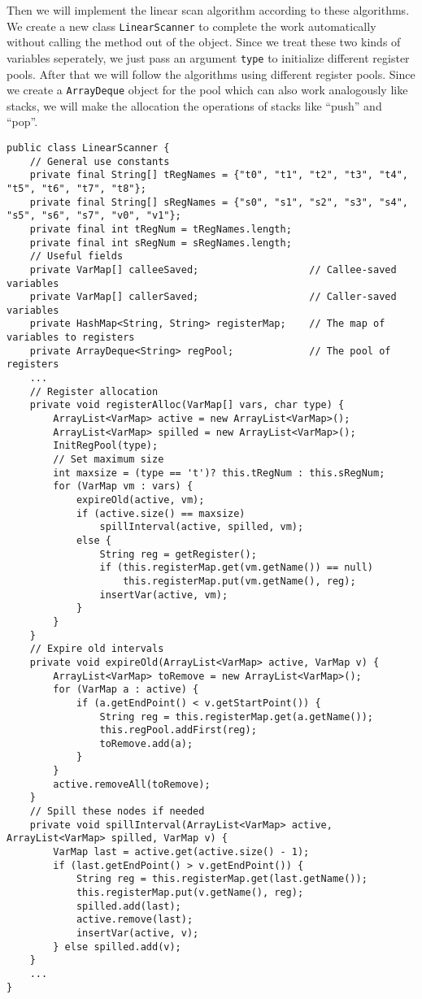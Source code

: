 \documentclass[letterpaper, 14pt]{article}
\begin{document}
Then we will implement the linear scan algorithm \cite{paper} according to these algorithms. We create a new class \texttt{LinearScanner} to complete the work automatically without calling the method out of the object. Since we treat these two kinds of variables seperately, we just pass an argument \texttt{type} to initialize different register pools. After that we will follow the algorithms using different register pools. Since we create a \texttt{ArrayDeque} object for the pool which can also work analogously like stacks, we will make the allocation the operations of stacks like ``push'' and ``pop''. 
\begin{lstlisting}
public class LinearScanner {
	// General use constants
	private final String[] tRegNames = {"t0", "t1", "t2", "t3", "t4", "t5", "t6", "t7", "t8"};
	private final String[] sRegNames = {"s0", "s1", "s2", "s3", "s4", "s5", "s6", "s7", "v0", "v1"};
	private final int tRegNum = tRegNames.length;
	private final int sRegNum = sRegNames.length;
	// Useful fields
	private VarMap[] calleeSaved;					// Callee-saved variables
	private VarMap[] callerSaved;					// Caller-saved variables
	private HashMap<String, String> registerMap;	// The map of variables to registers
	private ArrayDeque<String> regPool;				// The pool of registers
	...
	// Register allocation
	private void registerAlloc(VarMap[] vars, char type) {
		ArrayList<VarMap> active = new ArrayList<VarMap>();
		ArrayList<VarMap> spilled = new ArrayList<VarMap>();
		InitRegPool(type);
		// Set maximum size
		int maxsize = (type == 't')? this.tRegNum : this.sRegNum;
		for (VarMap vm : vars) {
			expireOld(active, vm);
			if (active.size() == maxsize)
				spillInterval(active, spilled, vm);
			else {
				String reg = getRegister();
				if (this.registerMap.get(vm.getName()) == null)
					this.registerMap.put(vm.getName(), reg);
				insertVar(active, vm);
			}
		}
	}
	// Expire old intervals
	private void expireOld(ArrayList<VarMap> active, VarMap v) {
		ArrayList<VarMap> toRemove = new ArrayList<VarMap>();
		for (VarMap a : active) {
			if (a.getEndPoint() < v.getStartPoint()) {
				String reg = this.registerMap.get(a.getName());
				this.regPool.addFirst(reg);
				toRemove.add(a);
			}
		}
		active.removeAll(toRemove);
	}	
	// Spill these nodes if needed
	private void spillInterval(ArrayList<VarMap> active, ArrayList<VarMap> spilled, VarMap v) {
		VarMap last = active.get(active.size() - 1);
		if (last.getEndPoint() > v.getEndPoint()) {
			String reg = this.registerMap.get(last.getName());
			this.registerMap.put(v.getName(), reg);
			spilled.add(last);
			active.remove(last);
			insertVar(active, v);
		} else spilled.add(v);
	}
	...
}
\end{lstlisting}
\end{document}
